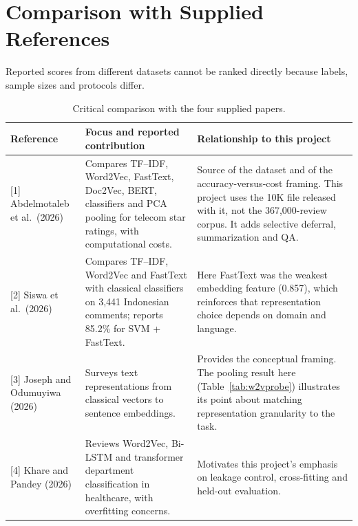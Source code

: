 \documentclass[11pt,a4paper]{article}
\begin{document}
\section{Comparison with Supplied References}
Reported scores from different datasets cannot be ranked directly because labels, sample sizes and protocols differ.
\begin{table}[H]\centering\footnotesize
\caption{Critical comparison with the four supplied papers.}
\begin{tabular}{p{2.7cm}p{5.4cm}p{6.1cm}}
\toprule
Reference & Focus and reported contribution & Relationship to this project\\
\midrule
{[}1{]} Abdelmotaleb et al.\ (2026) & Compares TF--IDF, Word2Vec, FastText, Doc2Vec, BERT, classifiers and PCA pooling for telecom star ratings, with computational costs. & Source of the dataset and of the accuracy-versus-cost framing. This project uses the 10K file released with it, not the 367,000-review corpus. It adds selective deferral, summarization and QA.\\
{[}2{]} Siswa et al.\ (2026) & Compares TF--IDF, Word2Vec and FastText with classical classifiers on 3,441 Indonesian comments; reports 85.2\% for SVM + FastText. & Here FastText was the weakest embedding feature (0.857), which reinforces that representation choice depends on domain and language.\\
{[}3{]} Joseph and Odumuyiwa (2026) & Surveys text representations from classical vectors to sentence embeddings. & Provides the conceptual framing. The pooling result here (Table~\ref{tab:w2vprobe}) illustrates its point about matching representation granularity to the task.\\
{[}4{]} Khare and Pandey (2026) & Reviews Word2Vec, Bi-LSTM and transformer department classification in healthcare, with overfitting concerns. & Motivates this project's emphasis on leakage control, cross-fitting and held-out evaluation.\\
\bottomrule
\end{tabular}
\end{table}
\end{document}
